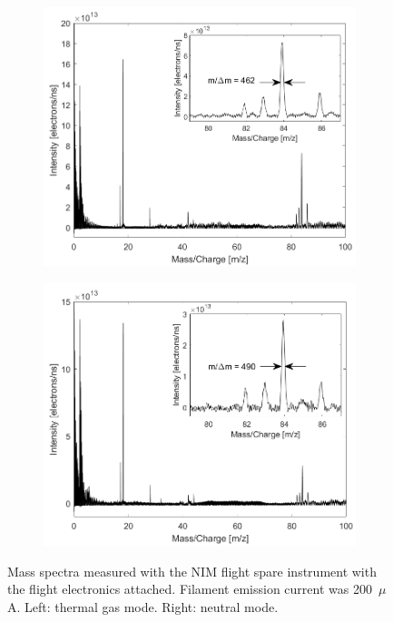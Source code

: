 		\begin{figure}[h!]
			\begin{subfigure}{0.5\textwidth} %
				\centering
				\includegraphics[width = \textwidth]{Experiments/FSthMode200uA.png}
			\end{subfigure}
			\begin{subfigure}{0.5\textwidth} %
				\centering
				\includegraphics[width = \textwidth]{Experiments/FSnMode200uA.png}
			\end{subfigure}
			\caption{Mass spectra measured with the NIM flight spare instrument with the flight electronics attached. Filament emission current was 200~$\mu$A. Left: thermal gas mode. Right: neutral mode.}
			\label{fig:ExpFSFlightElMassRes}
		\end{figure}
